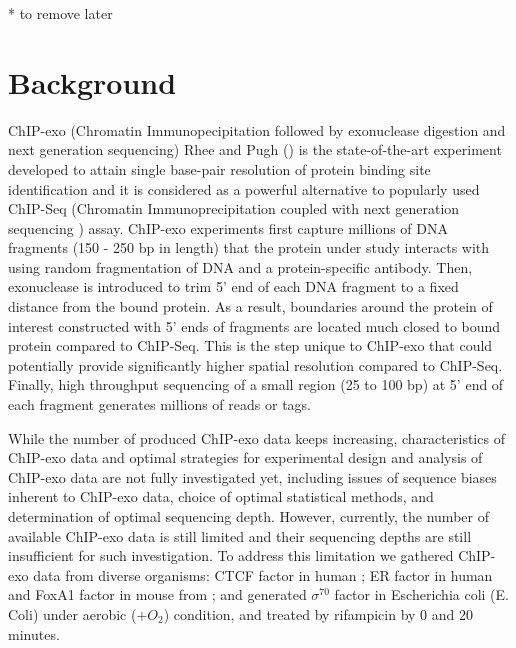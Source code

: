 \documentclass{bmcart}\usepackage[]{graphicx}\usepackage[]{color}
\begin{document}
\newpage

* to remove later

\tableofcontents

\newpage

\listoffigures

\newpage

\section{Background}
\label{sec:intro}

ChIP-exo (Chromatin Immunopecipitation followed by exonuclease
digestion and next generation sequencing) Rhee and Pugh (\cite{exo1})
is the state-of-the-art experiment developed to attain single
base-pair resolution of protein binding site identification and it is
considered as a powerful alternative to popularly used ChIP-Seq
(Chromatin Immunoprecipitation coupled with next generation sequencing
) assay. ChIP-exo experiments first capture millions of DNA fragments
(150 - 250 bp in length) that the protein under study interacts with
using random fragmentation of DNA and a protein-specific
antibody. Then, exonuclease is introduced to trim 5' end of each DNA
fragment to a fixed distance from the bound protein. As a result,
boundaries around the protein of interest constructed with 5' ends of
fragments are located much closed to bound protein compared to
ChIP-Seq. This is the step unique to ChIP-exo that could potentially
provide significantly higher spatial resolution compared to
ChIP-Seq. Finally, high throughput sequencing of a small region (25 to
100 bp) at 5' end of each fragment generates millions of reads or
tags.

While the number of produced ChIP-exo data keeps increasing,
characteristics of ChIP-exo data and optimal strategies for
experimental design and analysis of ChIP-exo data are not fully
investigated yet, including issues of sequence biases inherent to
ChIP-exo data, choice of optimal statistical methods, and
determination of optimal sequencing depth. However, currently, the
number of available ChIP-exo data is still limited and their
sequencing depths are still insufficient for such investigation. To
address this limitation we gathered ChIP-exo data from diverse
organisms: CTCF factor in human \cite{exo1}; ER factor in human and
FoxA1 factor in mouse from \cite{exoillumina}; and generated
$\sigma^{70}$ factor in Escherichia coli (E. Coli) under aerobic ($ +
O_2$) condition, and treated by rifampicin by 0 and 20 minutes.
\end{document}
